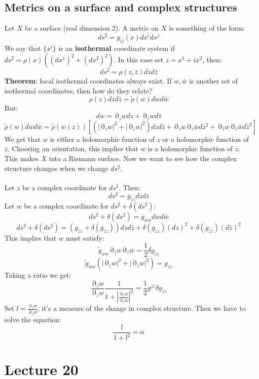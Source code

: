 \documentclass[12 pt]{article}
\DeclareMathOperator {\p} {\partial}
\theoremstyle{plain}
\theoremstyle{definition}
\theoremstyle{remark}
\begin{document}
\subsection*{Metrics on a surface and complex structures}
Let $X$ be a surface (real dimension 2). A metric on $X$ is something of the form:
\[     ds^2 = g_{ij}(x) dx^i dx^j       \]
We say that $\{x^i\}$ is an \textbf{isothermal} coordinate system if $ds^2 = \rho(x) ((dx^1)^2 + (dx^2)^2)$. In this case set $z = x^1 + i x^2$, then:
\[        ds^2 = \rho(z, \bar z) dz d\bar z      \]
\textbf{Theorem}: local isothermal coordinates always exist. If $w, \bar w$ is another set of isothermal coordinates, then how do they relate?
\[      \rho(z) dz d\bar z = \tilde \rho(w) dw d\bar w       \]
But:
\[        dw = \p_z w dz + \p_{\bar z} w d\bar z       \]
\[         \tilde \rho(w) dw d\bar w = \tilde \rho(w(z))  \left[ (|\p_z w|^2 + |\p_{\bar z} w|^2) dz d\bar z + \p_z w \p_z \bar w dz^2 + \p_{\bar z} w \p_{\bar z} \bar w d\bar z^2  \right]       \]
We get that $w$ is either a holomorphic function of $z$ or a holomorphic function of $\bar z$. Choosing an orientation, this implies that $w$ is a holomorphic function of $z$. This makes $X$ into a Riemann surface. Now we want to see how the complex structure changes when we change $ds^2$.
\\
\\
Let $z$ be a complex coordinate for $ds^2$. Then:
\[        ds^2 = g_{\bar z z} dz d\bar z       \]
Let $w$ be a complex coordinate for $ds^2 + \delta(ds^2)$:
\[       ds^2 + \delta( ds^2)= g_{\bar w w} dw d\bar w        \]
\[       ds^2 + \delta( ds^2)= (g_{\bar z z} + \delta(g_{\bar z z})) dz d\bar z  + \delta(g_{ z z}) (dz)^2 +  \delta(g_{\bar z \bar z}) (d\bar z)^2     \]
This implies that $w$ must satisfy:
\[       \tilde g_{\bar w w} \p_{\bar z} w \p_{\bar z} \bar w = \frac{1}{2}  \delta g_{\bar z \bar z}      \]
\[       \tilde g_{\bar w w} ( |\p_z w|^2 + |\p_{\bar z} w|^2) = g_{z \bar z}            \]
Taking a ratio we get:
\[          \frac{\p_{\bar z} w}{\p_z w}   \frac{1}{1+ \left| \frac{\p_{\bar z} w}{\p_z w}  \right|^2}  = \frac{1}{2} g^{z \bar z} \delta g_{\bar z \bar z}     \]
Set $l = \frac{\p_{\bar z} w}{\p_z w}$, it's a measure of the change in complex structure. Then we have to solve the equation:
\[     \frac{l}{1+l^2} = \alpha     \]


\section*{Lecture 20}
\end{document}
